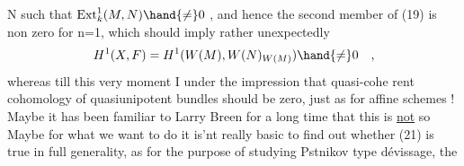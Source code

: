 N such that  $\mathrm{Ext}^{1}_{k}(M,N) \hand{\neq} 0$ ,  and hence the second member of (19) is
non zero for n=1,  which should imply rather unexpectedly
\[ H^{1}(X,F) = H^{1}(W(M), W(N)_{W(M)}) \hand{\neq} 0 \quad , \]
whereas till this very moment I   under the impression that quasi-cohe%
rent cohomology of quasiunipotent bundles should be zero,  just as
for affine schemes !  Maybe it has been familiar to Larry Breen for a
long time that this is \uline{not} so  Maybe  for what we want to do it is'nt
really basic to find out whether (21) is true in full generality,  as
for the purpose of studying Pstnikov type dévissage,  the 


